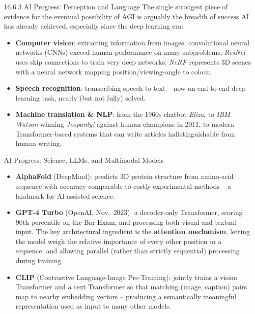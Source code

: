 \documentclass[aspectratio=169,10pt]{beamer}
\begin{document}
\begin{frame}{16.6.3 AI Progress: Perception and Language}
  The single strongest piece of evidence for the eventual possibility of
  AGI is arguably the breadth of success AI has already achieved,
  especially since the deep learning era:
  \begin{itemize}
    \item \textbf{Computer vision}: extracting information from images;
      convolutional neural networks (CNNs) exceed human performance on many
      subproblems; \emph{ResNet} uses skip connections to train very deep
      networks; \emph{NeRF} represents 3D scenes with a neural network
      mapping position/viewing-angle to colour.
    \item \textbf{Speech recognition}: transcribing speech to text -- now
      an end-to-end deep-learning task, nearly (but not fully) solved.
    \item \textbf{Machine translation \& NLP}: from the 1960s chatbot
      \emph{Eliza}, to \emph{IBM Watson} winning \emph{Jeopardy!} against
      human champions in 2011, to modern Transformer-based systems that can
      write articles indistinguishable from human writing.
  \end{itemize}
\end{frame}

\begin{frame}{AI Progress: Science, LLMs, and Multimodal Models}
  \begin{itemize}
    \item \textbf{AlphaFold} (DeepMind): predicts 3D protein structure from
      amino-acid sequence with accuracy comparable to costly experimental
      methods -- a landmark for AI-assisted science.
    \item \textbf{GPT-4 Turbo} (OpenAI, Nov.\ 2023): a decoder-only
      Transformer, scoring 90th percentile on the Bar Exam, and processing
      both visual and textual input. The key architectural ingredient is
      the \textbf{attention mechanism}, letting the model weigh the
      relative importance of every other position in a sequence, and
      allowing parallel (rather than strictly sequential) processing during
      training.
    \item \textbf{CLIP} (Contrastive Language-Image Pre-Training):
      jointly trains a vision Transformer and a text Transformer so that
      matching (image, caption) pairs map to nearby embedding vectors --
      producing a semantically meaningful representation used as input to
      many other models.
  \end{itemize}
\end{frame}
\end{document}

